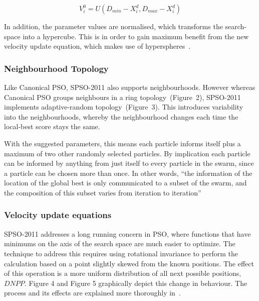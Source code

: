 \documentclass{csfourzero}
\begin{document}
\begin{equation}
  V_i^0 = U(D_{min} - X_i^d, D_{max} - X_i^d)
\end{equation}

In addition, the parameter values are normalised, which transforms the
search-space into a hypercube. This is in order to gain maximum benefit from the
new velocity update equation, which makes use of
hyperspheres~\cite{Clerc:2012to}.

\subsubsection{Neighbourhood Topology}

Like Canonical PSO, SPSO-2011 also supports neighbourhoods. However whereas
Canonical PSO groups neighbours in a ring topology~(Figure~2), SPSO-2011
implements adaptive-random topology~(Figure~3). This introduces variability into
the neighbourhoods, whereby the neighbourhood changes each time the local-best
score stays the same.

With the suggested parameters, this means each particle informs itself plus a
maximum of two other randomly selected particles. By implication each particle
can be informed by anything from just itself to every particle in the swarm,
since a particle can be chosen more than once. In other words, ``the information
of the location of the global best is only communicated to a subset of the
swarm, and the composition of this subset varies from iteration to
iteration''~\cite{Miranda:2007er}

\subsubsection{Velocity update equations}

SPSO-2011 addresses a long running concern in PSO, where functions that
have minimums on the axis of the search space are much easier to optimize. The
technique to address this requires using rotational invariance to perform the
calculation based on a point slightly skewed from the known positions. The
effect of this operation is a more uniform distribution of all next possible
positions, $DNPP$.  Figure 4 and Figure 5 graphically depict this change in
behaviour.  The process and its effects are explained more thoroughly
in~\cite{ZambranoBigiarini:2013dl}.
\end{document}
